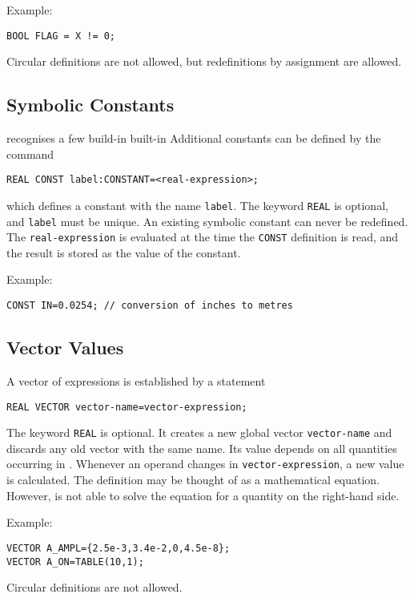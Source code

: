 \noindent Example:
\begin{verbatim}
BOOL FLAG = X != 0;
\end{verbatim}
Circular definitions are not allowed, but redefinitions by assignment 
are allowed.

\subsection{Symbolic Constants}
\label{sec:constant}
\opal recognises a few build-in built-in  
Additional constants can be defined by the command
\begin{verbatim}
REAL CONST label:CONSTANT=<real-expression>;
\end{verbatim}
which defines a constant with the name \texttt{label}.
The keyword \texttt{REAL} is optional, and \texttt{label} must be unique.
An existing symbolic constant can never be redefined.
The \texttt{real-expression} is evaluated at the time the
\texttt{CONST} definition is read, and the result is stored as the
value of the constant.

\noindent Example:
\begin{verbatim}
CONST IN=0.0254; // conversion of inches to metres
\end{verbatim}

\subsection{Vector Values}
\label{sec:vector}
A vector of expressions is established by a statement
\begin{verbatim}
REAL VECTOR vector-name=vector-expression;
\end{verbatim}
The keyword \texttt{REAL} is optional.
It creates a new global vector \texttt{vector-name}
and discards any old vector with the same name.
Its value depends on all quantities occurring in 
.
Whenever an operand changes in \texttt{vector-expression},
a new value is calculated.
The definition may be thought of as a mathematical equation.
However, \opal is not able to solve the equation for a quantity on the
right-hand side.

\noindent Example:
\begin{verbatim}
VECTOR A_AMPL={2.5e-3,3.4e-2,0,4.5e-8};
VECTOR A_ON=TABLE(10,1);
\end{verbatim}
Circular definitions are not allowed.

